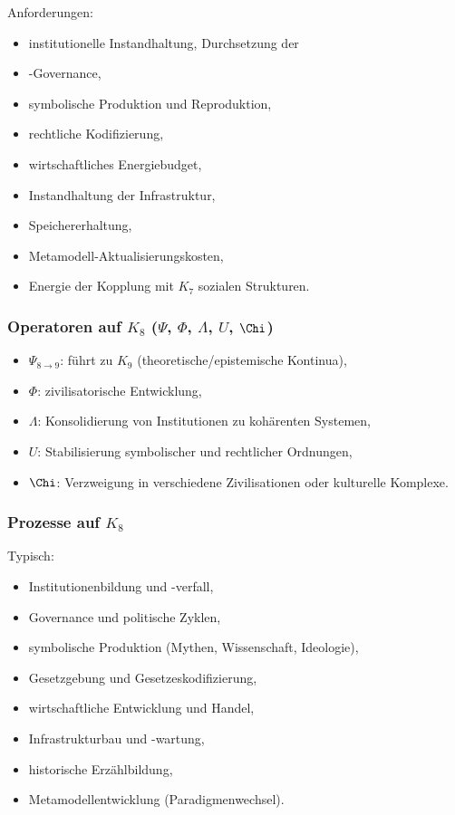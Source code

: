Anforderungen:
\begin{itemize}
    \item institutionelle Instandhaltung,
    Durchsetzung der \item-Governance,
    \item symbolische Produktion und Reproduktion,
    \item rechtliche Kodifizierung,
    \item wirtschaftliches Energiebudget,
    \item Instandhaltung der Infrastruktur,
    \item Speichererhaltung,
    \item Metamodell-Aktualisierungskosten,
    \item Energie der Kopplung mit $K_7$ sozialen Strukturen.
\end{itemize}

\subsubsection{Operatoren auf \texorpdfstring{$K_8$}{K_8} (\texorpdfstring{$\Psi$}{\Psi}, \texorpdfstring{$\Phi$}{\Phi}, \texorpdfstring{$\Lambda$}{\Lambda}, \texorpdfstring{$U$}{U}, \texorpdfstring{$\Chi$}{\Chi})}

\begin{itemize}
    \item $\Psi_{8\to9}$: führt zu $K_9$ (theoretische/epistemische Kontinua),
    \item $\Phi$: zivilisatorische Entwicklung,
    \item $\Lambda$: Konsolidierung von Institutionen zu kohärenten Systemen,
    \item $U$: Stabilisierung symbolischer und rechtlicher Ordnungen,
    \item $\Chi$: Verzweigung in verschiedene Zivilisationen oder kulturelle Komplexe.
\end{itemize}

\subsubsection{Prozesse auf \texorpdfstring{$K_8$}{K_8}}

Typisch:
\begin{itemize}
    \item Institutionenbildung und -verfall,
    \item Governance und politische Zyklen,
    \item symbolische Produktion (Mythen, Wissenschaft, Ideologie),
    \item Gesetzgebung und Gesetzeskodifizierung,
    \item wirtschaftliche Entwicklung und Handel,
    \item Infrastrukturbau und -wartung,
    \item historische Erzählbildung,
    \item Metamodellentwicklung (Paradigmenwechsel).
\end{itemize}

